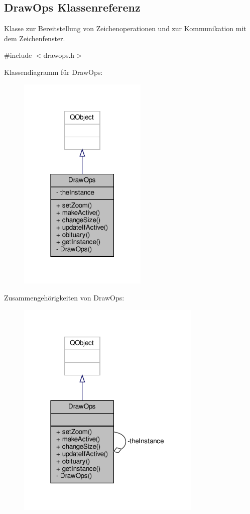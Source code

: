 \hypertarget{classDrawOps}{}\subsection{Draw\+Ops Klassenreferenz}
\label{classDrawOps}


Klasse zur Bereitstellung von Zeichenoperationen und zur Kommunikation mit dem Zeichenfenster.  




{\ttfamily \#include $<$drawops.\+h$>$}



Klassendiagramm für Draw\+Ops\+:
\nopagebreak
\begin{figure}[H]
\begin{center}
\leavevmode
\includegraphics[width=174pt]{classDrawOps__inherit__graph}
\end{center}
\end{figure}


Zusammengehörigkeiten von Draw\+Ops\+:
\nopagebreak
\begin{figure}[H]
\begin{center}
\leavevmode
\includegraphics[width=250pt]{classDrawOps__coll__graph}
\end{center}
\end{figure}
